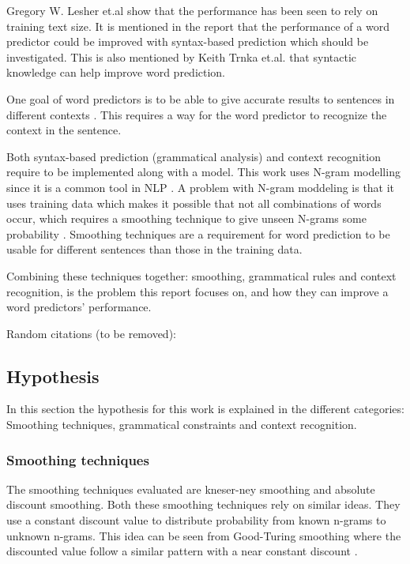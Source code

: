 Gregory W. Lesher et.al \cite{Lesher99effectsof} show that the performance has been seen to rely on training text size. It is mentioned in the report that the performance of a word predictor could be improved with syntax-based prediction which should be investigated. This is also mentioned by Keith Trnka et.al.\cite{keystrokes} that syntactic knowledge can help improve word prediction.
 
One goal of word predictors is to be able to give accurate results to sentences in different contexts \cite{DBLP:journals/corr/cs-CL-0009027}. This requires a way for the word predictor to recognize the context in the sentence.
 
Both syntax-based prediction (grammatical analysis) and context recognition require to be implemented along with a model. This work uses N-gram modelling since it is a common tool in NLP \cite{Wandmacher}. A problem with N-gram moddeling is that it uses training data which makes it possible that not all combinations of words occur, which requires a smoothing technique to give unseen N-grams some probability \cite{Russel}. Smoothing techniques are a requirement for word prediction to be usable for different sentences than those in the training data.
 
Combining  these techniques together: smoothing, grammatical rules and context recognition, is the problem this report focuses on, and how they can improve a word predictors' performance.

Random citations (to be removed): \cite{keystrokes}\cite{smoothing}\cite{corpus}\cite{aurora}

\subsection{Hypothesis}
In this section the hypothesis for this work is explained in the different categories: Smoothing techniques, grammatical constraints and context recognition.
\subsubsection{Smoothing techniques}
The smoothing techniques evaluated are kneser-ney smoothing and absolute discount smoothing. Both these smoothing techniques rely on similar ideas. They use a constant discount value to distribute probability from known n-grams to unknown n-grams. This idea can be seen from Good-Turing smoothing where the discounted value follow a similar pattern with a near constant discount \cite{coursera}.

